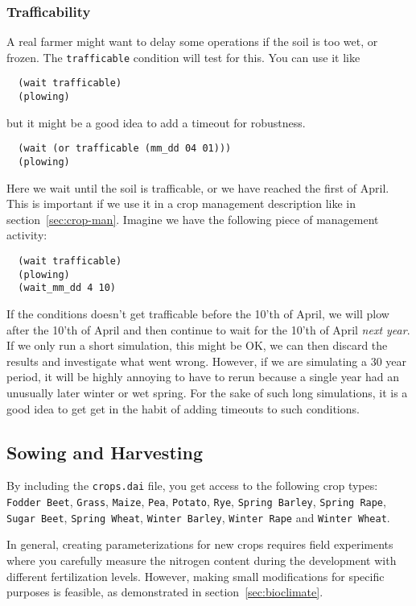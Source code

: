 \documentclass[a4paper,11pt]{article}
\begin{document}
\subsubsection{Trafficability}
\label{sec:trafficable}

A real farmer might want to delay some operations if the soil is too
wet, or frozen.  The \texttt{trafficable} condition will test for
this.  You can use it like
\begin{verbatim}
  (wait trafficable)
  (plowing)
\end{verbatim}
but it might be a good idea to add a timeout for robustness.
\begin{verbatim}
  (wait (or trafficable (mm_dd 04 01)))
  (plowing)
\end{verbatim}
Here we wait until the soil is trafficable, or we have reached the
first of April.  This is important if we use it in a crop management
description like in section~\ref{sec:crop-man}.  Imagine we have the
following piece of management activity:
\begin{verbatim}
  (wait trafficable)
  (plowing)
  (wait_mm_dd 4 10)
\end{verbatim}
If the conditions doesn't get trafficable before the 10'th of April,
we will plow after the 10'th of April and then continue to wait for
the 10'th of April \emph{next year}.  If we only run a short
simulation, this might be OK, we can then discard the results and
investigate what went wrong.  However, if we are simulating a 30 year
period, it will be highly annoying to have to rerun because a single
year had an unusually later winter or wet spring.  For the sake of
such long simulations, it is a good idea to get get in the habit of
adding timeouts to such conditions.

\subsection{Sowing and Harvesting}
\label{sec:sow}

By including the \texttt{crops.dai} file, you get access to the
following crop types: \texttt{Fodder Beet}, \texttt{Grass},
\texttt{Maize}, \texttt{Pea}, \texttt{Potato}, \texttt{Rye},
\texttt{Spring Barley}, \texttt{Spring Rape}, \texttt{Sugar Beet},
\texttt{Spring Wheat}, \texttt{Winter Barley}, \texttt{Winter Rape}
and \texttt{Winter Wheat}.

In general, creating parameterizations for new crops requires field
experiments where you carefully measure the nitrogen content during
the development with different fertilization levels.  However, making
small modifications for specific purposes is feasible, as
demonstrated in section~\ref{sec:bioclimate}.
\end{document}
